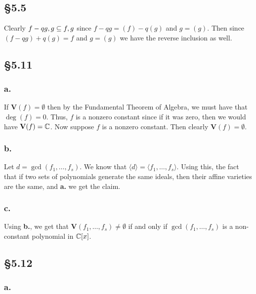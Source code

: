 \documentclass[letterpaper]{article}
\begin{document}
\subsection*{\S 5.5}

Clearly $\ideal{f - qg, g} \subseteq \ideal{f, g}$ since $f -qg = (f) - q(g)$ and $g = (g)$.
Then since $(f - qg) + q(g) = f$ and $g = (g)$ we have the reverse inclusion as well.

\clearpage

\subsection*{\S 5.11}

\subsubsection*{a.}

If $\textbf{V}(f) = \emptyset$ then by the Fundamental Theorem of Algebra, we must have that $\deg(f) = 0$.
Thus, $f$ is a nonzero constant since if it was zero, then we would have $\textbf{V}(f) = \mathbb{C}$.
Now suppose $f$ is a nonzero constant.
Then clearly $\textbf{V}(f) = \emptyset$.

\subsubsection*{b.}

Let $d = \gcd(f_{1}, \ldots, f_{s})$.
We know that $\langle d \rangle = \langle f_{1}, \ldots, f_{s} \rangle$.
Using this, the fact that if two sets of polynomials generate the same ideals, then their affine varieties are the same, and \textbf{a.} we get the claim.

\subsubsection*{c.}

Using \textbf{b.}, we get that $\textbf{V}(f_{1}, \ldots, f_{s}) \neq \emptyset$ if and only if $\gcd(f_{1}, \ldots, f_{s})$ is a non-constant polynomial in $\mathbb{C}[x]$.

\subsection*{\S 5.12}

\subsubsection*{a.}
\end{document}
